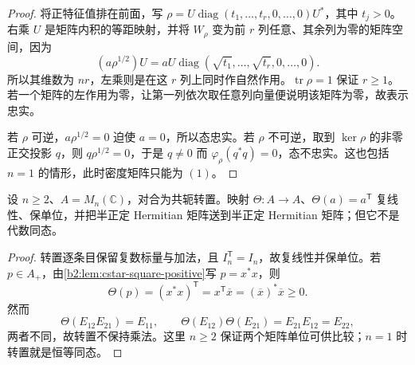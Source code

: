 \begin{proof}
	将正特征值排在前面，写 \(\rho=U\operatorname{diag}(t_1,\ldots,t_r,0,\ldots,0)U^*\)，其中 \(t_j>0\)。右乘 \(U\) 是矩阵内积的等距映射，并将 \(W_\rho\) 变为前 \(r\) 列任意、其余列为零的矩阵空间，因为
	\[
		(a\rho^{1/2})U =aU\operatorname{diag}(\sqrt{t_1},\ldots,\sqrt{t_r},0,\ldots,0).
	\]
	所以其维数为 \(nr\)，左乘则是在这 \(r\) 列上同时作自然作用。\(\operatorname{tr}\rho=1\) 保证 \(r\ge1\)。若一个矩阵的左作用为零，让第一列依次取任意列向量便说明该矩阵为零，故表示忠实。

	若 \(\rho\) 可逆，\(a\rho^{1/2}=0\) 迫使 \(a=0\)，所以态忠实。若 \(\rho\) 不可逆，取到 \(\ker\rho\) 的非零正交投影 \(q\)，则 \(q\rho^{1/2}=0\)，于是 \(q\ne0\) 而 \(\varphi_\rho(q^*q)=0\)，态不忠实。这也包括 \(n=1\) 的情形，此时密度矩阵只能为 \((1)\)。
\end{proof}

\begin{proposition}[正映射不必保持乘法]\label{b2:prop:D-positive-not-hom}
	设 \(n\ge2\)、\(A=M_n(\mathbb C)\)，对合为共轭转置。映射 \(\Theta:A\to A\)、\(\Theta(a)=a^{\mathsf T}\) 复线性、保单位，并把半正定 Hermitian 矩阵送到半正定 Hermitian 矩阵；但它不是代数同态。
\end{proposition}
\begin{proof}
	转置逐条目保留复数标量与加法，且 \(I_n^{\mathsf T}=I_n\)，故复线性并保单位。若 \(p\in A_+\)，由\cref{b2:lem:cstar-square-positive}写 \(p=x^*x\)，则
	\[
		\Theta(p)=(x^*x)^{\mathsf T} =x^{\mathsf T}\overline x=(\overline x)^*\overline x\ge0.
	\]
	然而
	\[
		\Theta(E_{12}E_{21})=E_{11},\qquad \Theta(E_{12})\Theta(E_{21})=E_{21}E_{12}=E_{22},
	\]
	两者不同，故转置不保持乘法。这里 \(n\ge2\) 保证两个矩阵单位可供比较；\(n=1\) 时转置就是恒等同态。
\end{proof}
